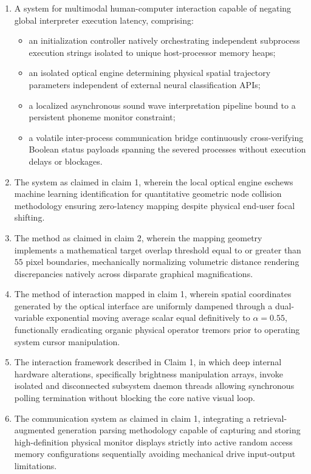 \documentclass[12pt, a4paper]{article}
\begin{document}
\begin{enumerate}[label=\arabic*.]
    \item A system for multimodal human-computer interaction capable of negating global interpreter execution latency, comprising:
    \begin{itemize}
        \item an initialization controller natively orchestrating independent subprocess execution strings isolated to unique host-processor memory heaps;
        \item an isolated optical engine determining physical spatial trajectory parameters independent of external neural classification APIs;
        \item a localized asynchronous sound wave interpretation pipeline bound to a persistent phoneme monitor constraint;
        \item a volatile inter-process communication bridge continuously cross-verifying Boolean status payloads spanning the severed processes without execution delays or blockages.
    \end{itemize}
    
    \item The system as claimed in claim 1, wherein the local optical engine eschews machine learning identification for quantitative geometric node collision methodology ensuring zero-latency mapping despite physical end-user focal shifting.
    
    \item The method as claimed in claim 2, wherein the mapping geometry implements a mathematical target overlap threshold equal to or greater than $55$ pixel boundaries, mechanically normalizing volumetric distance rendering discrepancies natively across disparate graphical magnifications.
    
    \item The method of interaction mapped in claim 1, wherein spatial coordinates generated by the optical interface are uniformly dampened through a dual-variable exponential moving average scalar equal definitively to $\alpha = 0.55$, functionally eradicating organic physical operator tremors prior to operating system cursor manipulation.
    
    \item The interaction framework described in Claim 1, in which deep internal hardware alterations, specifically brightness manipulation arrays, invoke isolated and disconnected subsystem daemon threads allowing synchronous polling termination without blocking the core native visual loop.
    
    \item The communication system as claimed in claim 1, integrating a retrieval-augmented generation parsing methodology capable of capturing and storing high-definition physical monitor displays strictly into active random access memory configurations sequentially avoiding mechanical drive input-output limitations.
    
\end{enumerate}
\end{document}
